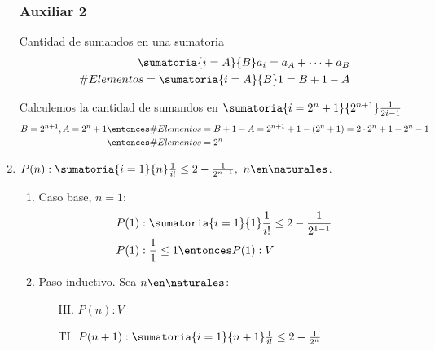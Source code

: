 \begin{enumerate}[label=\roman*)]
        \subsubsection*{Auxiliar 2}

        Cantidad de sumandos en una sumatoria
        \begin{align*}
          \sumatoria{i=A}{B}a_i = a_A + \dots + a_B \\
          \# Elementos = \sumatoria{i=A}{B}1 = B + 1 - A
        \end{align*}

        Calculemos la cantidad de sumandos en $ \sumatoria{i=2^n + 1}{2^{n+1}} \frac{1}{2i-1}$
        \begin{align*}
          B = 2^{n+1}, A = 2^n + 1 \entonces & \# Elementos = B + 1 - A = 2^{n+1} + 1  - (2^n + 1)
          = 2 \cdot 2^n + 1 - 2^n -1                                                              \\
          \entonces                          & \# Elementos = 2^n
        \end{align*}


  \item $P(n): \sumatoria{i=1}{n} \frac{1}{i!} \leq 2 - \frac{1}{2^{n-1}}, \ n \en \naturales$.
        \begin{enumerate}[label=\arabic*)]
          \item Caso base, $n = 1$:
                \begin{align*}
                  P(1) & : \sumatoria{i=1}{1} \frac{1}{i!} \leq 2 - \frac{1}{2^{1-1}} \\
                  P(1) & : \frac{1}{1} \leq 1 \entonces P(1):V
                \end{align*}
          \item Paso inductivo. Sea $n \en \naturales$:
                \begin{enumerate}
                  \item[HI.] $P(n): V$
                  \item[TI.] $P(n+1):  \sumatoria{i=1}{n+1} \frac{1}{i!} \leq 2 - \frac{1}{2^{n}}$
                \end{enumerate}


\end{enumerate}
\end{enumerate}
